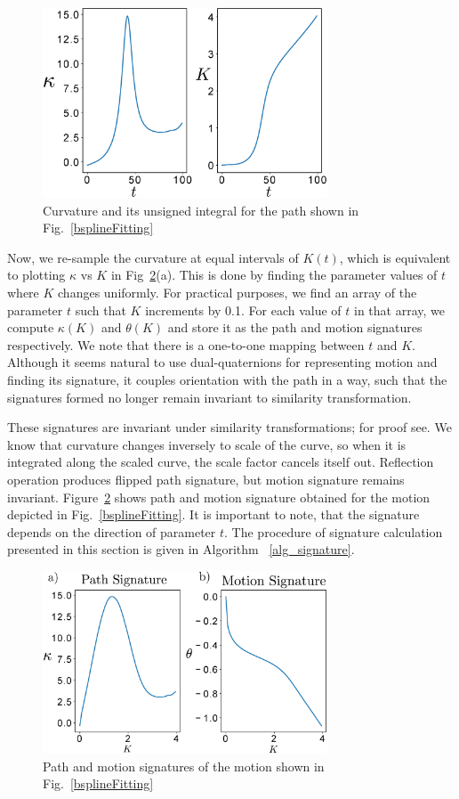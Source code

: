 \documentclass[twocolumn,10pt]{asme2ej}
\begin{document}
\begin{figure}
\centering
\includegraphics[width=240pt]{figure/fig_curvatureK.eps}
  \caption{Curvature and its unsigned integral for the path shown in Fig.~\ref{bsplineFitting}}
\label{curvatureK}
\end{figure}

Now, we re-sample the curvature at equal intervals of $K(t)$, which is equivalent to plotting $\kappa$ vs $K$ in Fig~\ref{signature}(a).
This is done by finding the parameter values of $t$ where $K$ changes uniformly.
For practical purposes, we find an array of the parameter $t$ such that $K$ increments by 0.1.
For each value of $t$ in that array, we compute $\kappa(K)$ and $\theta(K)$ and store it as the path and motion signatures respectively.
We note that there is a one-to-one mapping between $t$ and $K$.
Although it seems natural to use dual-quaternions for representing motion and finding its signature,
it couples orientation with the path in a way, such that the signatures formed no longer remain invariant to similarity transformation.

These signatures are invariant under similarity transformations; for proof see\cite{cui2009}.
We know that curvature changes inversely to scale of the curve, so when it is integrated along the scaled curve, the scale factor cancels itself out. Reflection operation produces flipped path signature, but motion signature remains invariant.
Figure~\ref{signature} shows path and motion signature obtained for the motion depicted in Fig.~\ref{bsplineFitting}. It is important to note, that the signature depends on the direction of parameter $t$.
The procedure of signature calculation presented in this section is given in Algorithm ~\ref{alg_signature}.

\begin{figure}
\centering
\includegraphics[width=240pt]{figure/fig_signatures.eps}
  \caption{Path and motion signatures of the motion shown in Fig.~\ref{bsplineFitting}}
\label{signature}
\end{figure}
\end{document}
